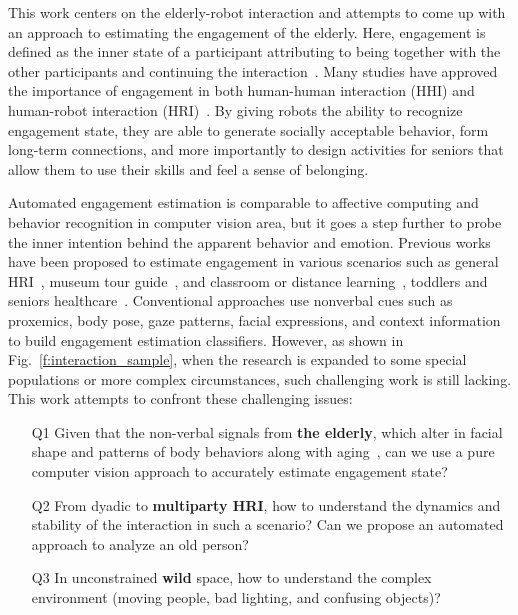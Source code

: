 \documentclass[10pt,journal,compsoc]{IEEEtran}
\begin{document}
This work centers on the elderly-robot interaction and attempts to come up with an approach to estimating the engagement of the elderly. Here, engagement is defined as the inner state of a participant attributing to being together with the other participants and continuing the interaction~\cite{Poggi2013Mind}. Many studies have approved the importance of engagement in both human-human interaction (HHI) and human-robot interaction (HRI)~\cite{Jones2018Engagement}. By giving robots the ability to recognize engagement state, they are able to generate socially acceptable behavior, form long-term connections, and more importantly to design activities for seniors that allow them to use their skills and feel a sense of belonging.

Automated engagement estimation is comparable to affective computing and behavior recognition in computer vision area, but it goes a step further to probe the inner intention behind the apparent behavior and emotion. Previous works have been proposed to estimate engagement in various scenarios such as general HRI~\cite{Salam2017Fully, Celiktutan2019Multimodal, BenYoussef2019Early, Saleh2021Improving}, museum tour guide~\cite{DelDuchetto2020Are}, and classroom or distance learning~\cite{BenEliyahu2018Investigating, Zhu2020Multirate, Rudovic2019Personalized, Sumer2021Multimodal, Monkaresi2017Automated, Abedi2021Affectdriven, Gao2020NGage}, toddlers and seniors healthcare~\cite{Anagnostopoulou2021Engagement, Jain2020Modeling, Jones2018Engagement, Steinert2020Engagement}. Conventional approaches use nonverbal cues such as proxemics, body pose, gaze patterns, facial expressions, and context information to build engagement estimation classifiers. However, as shown in Fig.~\ref{f:interaction_sample}, when the research is expanded to some special populations or more complex circumstances, such challenging work is still lacking. This work attempts to confront these challenging issues:
\begin{enumerate}
  \item[Q1] Given that the non-verbal signals from \textbf{the elderly}, which alter in facial shape and patterns of body behaviors along with aging~\cite{Guo2013Facial, Folster2014Facial}, can we use a pure computer vision approach to accurately estimate engagement state?
  \item[Q2] From dyadic to \textbf{multiparty HRI}, how to understand the dynamics and stability of the interaction in such a scenario? Can we propose an automated approach to analyze an old person?
  \item[Q3] In unconstrained \textbf{wild} space, how to understand the complex environment (moving people, bad lighting, and confusing objects)?
\end{enumerate}
\end{document}

